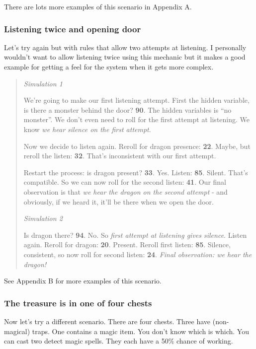 \documentclass[12pt]{article}
\begin{document}
There are lots more examples of this scenario in Appendix A.

\subsubsection*{Listening twice and opening door}

Let's try again but with rules that allow two attempts at
listening.
I personally wouldn't want to allow listening twice using this mechanic
but it makes a good example for getting a feel for the system when it gets more complex.

\begin{quote}
\emph{Simulation 1}

We're going to make our first listening attempt. First the hidden
variable, is there a monster behind the door? \textbf{90}. The hidden
variables is ``no monster''. We don't even need to roll for the
first attempt at listening. We know \emph{we hear silence on the first
attempt}.

Now we decide to listen again. Reroll for dragon presence: \textbf{22}.
Maybe, but reroll the listen: \textbf{32}. That's inconsistent with
our first attempt.

Restart the process: is dragon present?
\textbf{33}. Yes. Listen: \textbf{85}. Silent. That's compatible.
So we can now roll for the second listen: \textbf{41}. Our final
observation is that \emph{we hear the dragon on the second attempt} -
and obviously, if we heard it, it'll be there when we open the door.

\hrulefill

\emph{Simulation 2}

Is dragon there? \textbf{94}. No. So \emph{first attempt at listening
gives silence}. Listen again. Reroll for dragon: \textbf{20}. Present.
Reroll first listen: \textbf{85}. Silence,
consistent, so now roll for second listen: \textbf{24}. \emph{Final
observation: we hear the dragon!}
\end{quote}

See Appendix B for more examples of this scenario.

\iffalse
\subsubsection{The treasure is in one of four chests}

Now let's try a different scenario. There are four chests. Three
have (non-magical) traps. One contains a magic item. You don't know
which is which. You can cast two detect magic spells. They each have a
50\% chance of working.
\end{document}

